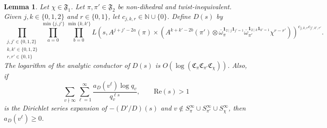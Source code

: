 \documentclass[11pt]{amsart}
\newtheorem{lemma}[theorem]{Lemma}
\theoremstyle{remark}
\newcommand{\re}{\mathrm{Re}}
\renewcommand{\bar}{\overline}
\numberwithin{equation}{section}
\begin{document}
\begin{lemma}
\label{lem:D}
Let $\chi\in\mathfrak{F}_1$.  Let $\pi,\pi'\in\mathfrak{F}_2$ be non-dihedral and twist-inequivalent.  Given $j,k\in\{0,1,2\}$ and $r\in\{0,1\}$, let $c_{j,k,r}\in\mathbb{N}\cup\{0\}$.  Define $D(s)$ by
\[
\prod_{\substack{j,j'\in\{0,1,2\} \\ k,k'\in\{0,1,2\} \\ r,r'\in\{0,1\}}}\prod_{a=0}^{\min\{j,j'\}}\prod_{b=0}^{\min\{k,k'\}}L(s, A^{j+j'-2a}(\pi)\times (A^{k+k'-2b}(\pi')\otimes \bar{\omega}_{\pi}^{\mathbf{1}_{2\mid j}\mathbf{1}_{j'=1}}\bar{\omega}_{\pi'}^{\mathbf{1}_{2\mid k}\mathbf{1}_{k'=1}}\chi^{r-r'}))^{c_{j,k,r}c_{j',k',r'}}.
\]
The logarithm of the analytic conductor of $D(s)$ is $O(\log(\mathfrak{C}_{\pi}\mathfrak{C}_{\pi'}\mathfrak{C}_{\chi}))$.  Also, if
\[
\sum_{v\nmid\infty}\sum_{\ell=1}^{\infty}\frac{a_D(v^{\ell})\log q_v}{q_v^{\ell s}},\qquad \re(s)>1
\]
is the Dirichlet series expansion of $-(D'/D)(s)$ and $v\notin S_{\pi}^{\infty}\cup S_{\pi'}^{\infty}\cup S_{\chi}^{\infty}$, then $a_D(v^{\ell})\geq 0$.
\end{lemma}
\end{document}
